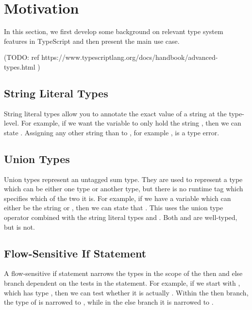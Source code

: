 \section{Motivation}
\label{sec:motivation}

In this section, we first develop some background on relevant type system features in TypeScript and then present the main use case.

(TODO: ref https://www.typescriptlang.org/docs/handbook/advanced-types.html )

\subsection{String Literal Types}

String literal types allow you to annotate the exact value of a string at the type-level. For example, if we want the variable  to only hold the string , then we can state . Assigning any other string than  to , for example , is a type error.

\subsection{Union Types}

Union types represent an untagged sum type. They are used to represent a type which can be either one type or another type, but there is no runtime tag which specifies which of the two it is. For example, if we have a variable which can either be the string  or , then we can state that . This uses the union type operator \ts{|} combined with the string literal types  and . Both  and  are well-typed, but  is not.

\subsection{Flow-Sensitive If Statement}

A flow-sensitive if statement narrows the types in the scope of the then and else branch dependent on the tests in the statement. For example, if we start with , which has type , then we can test whether it is actually . Within the then branch, the type of  is narrowed to , while in the else branch it is narrowed to .


